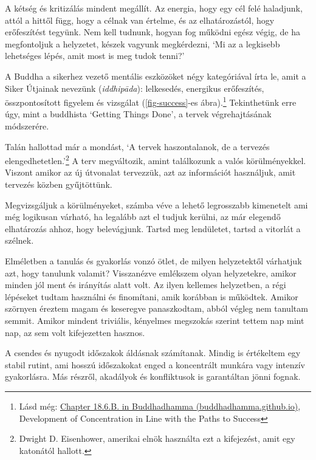 \noindent
A kétség és kritizálás mindent megállít. Az energia, hogy egy cél felé
haladjunk, attól a hittől függ, hogy a célnak van értelme, és az
elhatározástól, hogy erőfeszítést tegyünk. Nem kell tudnunk, hogyan fog
működni egész végig, de ha megfontoljuk a helyzetet, készek vagyunk
megkérdezni, `Mi az a legkisebb lehetséges lépés, amit most is meg tudok
tenni?'

A Buddha a sikerhez vezető mentális eszközöket négy kategóriával írta
le, amit a Siker Útjainak nevezünk (\emph{iddhipāda}): lelkesedés,
energikus erőfeszítés, összpontosított figyelem és vizsgálat
(\ref{fig-success}-es ábra).\footnote{Lásd még:
  \href{https://buddhadhamma.github.io/path-factors-of-concentration.html\#development-of-concentration-in-line-with-the-paths-to-success}{Chapter
  18.6.B. in Buddhadhamma (buddhadhamma.github.io)}, Development of
  Concentration in Line with the Paths to Success} Tekinthetünk erre
úgy, mint a buddhista `Getting Things Done', a tervek végrehajtásának
módszerére.

\clearpage

\vspace*{-\baselineskip}


Talán hallottad már a mondást, `A tervek haszontalanok, de a tervezés
elengedhetetlen.'\footnote{Dwight D. Eisenhower, amerikai elnök
  használta ezt a kifejezést, amit egy katonától hallott.} A terv
megváltozik, amint találkozunk a valós körülményekkel. Viszont amikor az
új útvonalat tervezzük, azt az információt használjuk, amit tervezés
közben gyűjtöttünk.

Megvizsgáljuk a körülményeket, számba véve a lehető legrosszabb
kimenetelt ami még logikusan várható, ha legalább azt el tudjuk kerülni,
az már elegendő elhatározás ahhoz, hogy belevágjunk. Tartsd meg
lendületet, tartsd a vitorlát a szélnek.

Elméletben a tanulás és gyakorlás vonzó ötlet, de milyen helyzetektől
várhatjuk azt, hogy tanulunk valamit? Visszanézve emlékszem olyan
helyzetekre, amikor minden jól ment és irányítás alatt volt. Az ilyen
kellemes helyzetben, a régi lépéseket tudtam használni és finomítani,
amik korábban is működtek. Amikor szörnyen éreztem magam és keseregve
panaszkodtam, abból végleg nem tanultam semmit. Amikor mindent
triviális, kényelmes megszokás szerint tettem nap mint nap, az sem volt
kifejezetten hasznos.

A csendes és nyugodt időszakok áldásnak számítanak. Mindig is értékeltem
egy stabil rutint, ami hosszú időszakokat enged a koncentrált munkára
vagy intenzív gyakorlásra. Más részről, akadályok és konfliktusok is
garantáltan jönni fognak.

